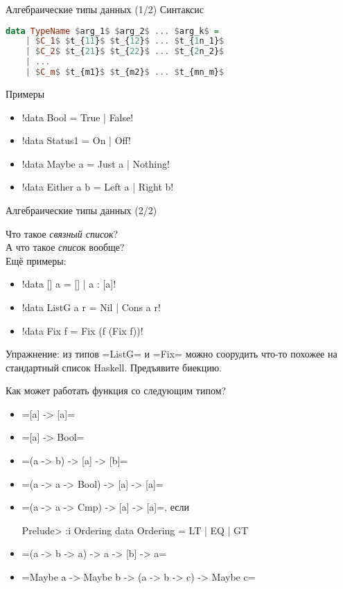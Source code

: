 \documentclass{beamer}
\begin{document}
\begin{frame}[fragile]{Алгебраические типы данных (1/2)}
Синтаксис
 \begin{lstlisting}[mathescape=true,language=haskell]
  data TypeName $arg_1$ $arg_2$ ... $arg_k$ = 
    | $C_1$ $t_{11}$ $t_{12}$ ... $t_{1n_1}$ 
    | $C_2$ $t_{21}$ $t_{22}$ ... $t_{2n_2}$ 
    | ...
    | $C_m$ $t_{m1}$ $t_{m2}$ ... $t_{mn_m}$ 
 \end{lstlisting}
 Примеры
 \begin{itemize}
  \item \hsinline!data Bool    = True | False!
  \item \hsinline!data Status1 = On   | Off!
  \item \hsinline!data Maybe a = Just a | Nothing!
  \item \hsinline!data Either a b = Left a | Right b!
 \end{itemize}
\end{frame}

\begin{frame}[fragile]{Алгебраические типы данных (2/2)}

{\Large \faQuestion} Что такое \textit{связный список}?\\ \pause
{\Large \faQuestion} А что такое \textit{список} вообще?\\ \pause
\vspace{1cm}
Ещё примеры:
\begin{itemize}
  \item \hsinline!data [] a = [] | a : [a]!
  \item \hsinline!data ListG a r = Nil | Cons a r!
  \item \hsinline!data Fix f = Fix (f (Fix f))! 
\end{itemize}
\vspace{1cm}
Упражнение: из типов \hsinline=ListG= и \hsinline=Fix= можно соорудить что-то похожее на стандартный список Haskell. Предъявите биекцию.
\end{frame}

\begin{frame}[fragile]{Как может работать функция со следующим типом?}
\begin{itemize}
 \item [{\Large \faQuestion}] \hsinline=[a] -> [a]=
 \item [{\Large \faQuestion}] \hsinline=[a] -> Bool=
 \item [{\Large \faQuestion}] \hsinline=(a -> b) -> [a] -> [b]=
 \item [{\Large \faQuestion}] \hsinline=(a -> a -> Bool) -> [a] -> [a]=
 \item [{\Large \faQuestion}] \hsinline=(a -> a -> Cmp) -> [a] -> [a]=, если
\begin{hslisting}
Prelude> :i Ordering
data Ordering = LT | EQ | GT   
\end{hslisting}
 \item [{\Large \faQuestion}] \hsinline=(a -> b -> a) -> a -> [b] -> a=
 \item [{\Large \faQuestion}] \hsinline=Maybe a -> Maybe b -> (a -> b -> c) -> Maybe c=
\end{itemize}
\end{frame}
\end{document}
